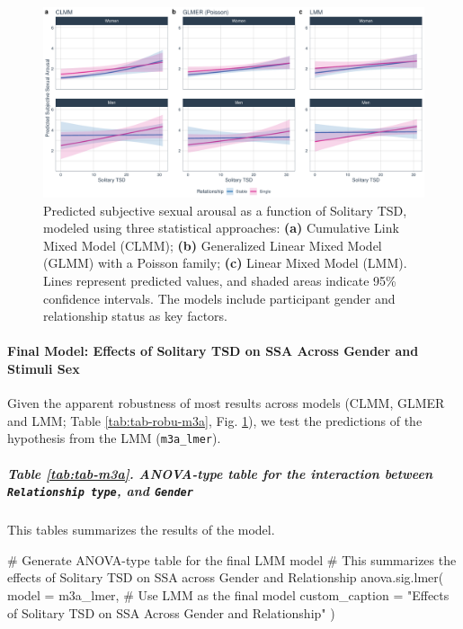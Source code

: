 \documentclass[
  bookmarksnumbered]{article}
\newenvironment{Shaded}{\begin{snugshade}}{\end{snugshade}}
\newcommand{\AttributeTok}[1]{\textcolor[rgb]{0.80,0.80,0.80}{#1}}
\newcommand{\CommentTok}[1]{\textcolor[rgb]{0.50,0.62,0.50}{#1}}
\newcommand{\FunctionTok}[1]{\textcolor[rgb]{0.94,0.94,0.56}{#1}}
\newcommand{\NormalTok}[1]{\textcolor[rgb]{0.80,0.80,0.80}{#1}}
\newcommand{\StringTok}[1]{\textcolor[rgb]{0.80,0.58,0.58}{#1}}
\begin{document}
\begin{figure}
\centering
\includegraphics{Sexual_Desire_Arousal_files/figure-latex/preds-m3a-1.pdf}
\caption{\label{fig:preds-m3a}Predicted subjective sexual arousal as a function of Solitary TSD, modeled using three statistical approaches: \textbf{(a)} Cumulative Link Mixed Model (CLMM); \textbf{(b)} Generalized Linear Mixed Model (GLMM) with a Poisson family; \textbf{(c)} Linear Mixed Model (LMM). Lines represent predicted values, and shaded areas indicate 95\% confidence intervals. The models include participant gender and relationship status as key factors.}
\end{figure}

\paragraph{Final Model: Effects of Solitary TSD on SSA Across Gender and Stimuli Sex}\label{final-model-effects-of-solitary-tsd-on-ssa-across-gender-and-stimuli-sex-1}

Given the apparent robustness of most results across models (CLMM, GLMER and LMM; Table \ref{tab:tab-robu-m3a}, Fig. \ref{fig:preds-m3a}), we test the predictions of the hypothesis from the LMM (\texttt{m3a\_lmer}).

\subparagraph{\texorpdfstring{Table \ref{tab:tab-m3a}. ANOVA-type table for the interaction between \texttt{Relationship\ type}, and \texttt{Gender}}{Table \ref{tab:tab-m3a}. ANOVA-type table for the interaction between Relationship type, and Gender}}\label{table-reftabtab-m3a.-anova-type-table-for-the-interaction-between-relationship-type-and-gender}

This tables summarizes the results of the model.

\begin{Shaded}
\begin{Highlighting}[]
\CommentTok{\# Generate ANOVA{-}type table for the final LMM model}
\CommentTok{\# This summarizes the effects of Solitary TSD on SSA across Gender and Relationship}
\FunctionTok{anova.sig.lmer}\NormalTok{(}
  \AttributeTok{model =}\NormalTok{ m3a\_lmer, }\CommentTok{\# Use LMM as the final model}
  \AttributeTok{custom\_caption =} \StringTok{"Effects of Solitary TSD on SSA Across Gender and Relationship"}
\NormalTok{)}
\end{Highlighting}
\end{Shaded}
\end{document}
